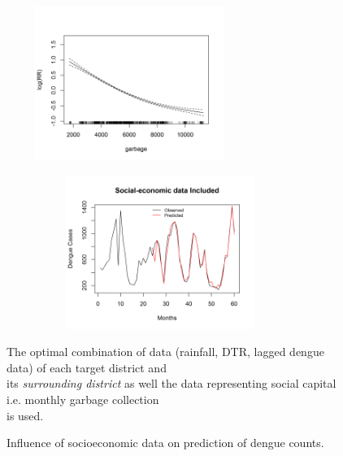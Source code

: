 \documentclass{bmcart}
\begin{document}
\begin{figure}[h!]
	\begin{minipage}[c]{1.0\textwidth}
		\vspace*{\fill}
		\centering
		\includegraphics[width=8cm,height=5.0cm]{17-Fit-garbage}
		\label{fig:socio1}\par\vfill
		\includegraphics[width=10cm,height=5.0cm]{18-Pred-SocialIncluded}
		\caption{The optimal combination of data (rainfall, DTR, lagged dengue data) of each target district and \\ its \textit{surrounding district} as well the data representing social capital i.e. monthly garbage collection \\ is used. }
		\label{fig:socio2} \par\vfill	
	\end{minipage}
	\caption{Influence of socioeconomic data on prediction of dengue counts.}
	\label{fig:socio}
\end{figure}
\end{document}
